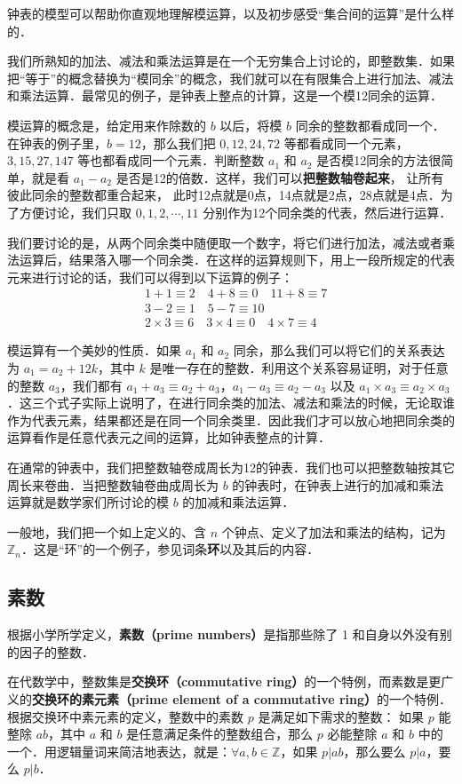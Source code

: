 钟表的模型可以帮助你直观地理解模运算，以及初步感受“集合间的运算”是什么样的．

我们所熟知的加法、减法和乘法运算是在一个无穷集合上讨论的，即整数集．如果把“等于”的概念替换为“模同余”的概念，我们就可以在有限集合上进行加法、减法和乘法运算．最常见的例子，是钟表上整点的计算，这是一个模12同余的运算．

模运算的概念是，给定用来作除数的 $b$ 以后，将模 $b$ 同余的整数都看成同一个．在钟表的例子里，$b=12$，那么我们把 $0,12,24,72$ 等都看成同一个元素，$3,15,27,147$ 等也都看成同一个元素．判断整数 $a_1$ 和 $a_2$ 是否模12同余的方法很简单，就是看 $a_1-a_2$ 是否是12的倍数．这样，我们可以\textbf{把整数轴卷起来}， 让所有彼此同余的整数都重合起来， 此时12点就是0点，14点就是2点，28点就是4点．为了方便讨论，我们只取 $0,1,2,\cdots,11$ 分别作为12个同余类的代表，然后进行运算．

我们要讨论的是，从两个同余类中随便取一个数字，将它们进行加法，减法或者乘法运算后，结果落入哪一个同余类．在这样的运算规则下，用上一段所规定的代表元来进行讨论的话，我们可以得到以下运算的例子：
\begin{equation}
\begin{aligned}
&1+1\equiv 2 \quad 4+8\equiv 0 \quad 11+8\equiv 7 \\
&3-2\equiv 1 \quad 5-7\equiv 10 \\
&2\times 3\equiv 6 \quad 3\times 4\equiv 0 \quad 4\times 7\equiv 4
\end{aligned}
\end{equation}

模运算有一个美妙的性质．如果 $a_1$ 和 $a_2$ 同余，那么我们可以将它们的关系表达为 $a_1=a_2+12k$，其中 $k$ 是唯一存在的整数．利用这个关系容易证明，对于任意的整数 $a_3$，我们都有 $a_1+a_3\equiv a_2+a_3$，$a_1-a_3\equiv a_2-a_3$ 以及 $a_1\times a_3\equiv a_2\times a_3$．这三个式子实际上说明了，在进行同余类的加法、减法和乘法的时候，无论取谁作为代表元素，结果都还是在同一个同余类里．因此我们才可以放心地把同余类的运算看作是任意代表元之间的运算，比如钟表整点的计算．

在通常的钟表中，我们把整数轴卷成周长为12的钟表．我们也可以把整数轴按其它周长来卷曲．当把整数轴卷曲成周长为 $b$ 的钟表时，在钟表上进行的加减和乘法运算就是数学家们所讨论的模 $b$ 的加减和乘法运算．

一般地，我们把一个如上定义的、含 $n$ 个钟点、定义了加法和乘法的结构，记为 $\mathbb{Z}_n$．这是“环”的一个例子，参见词条\textbf{环}以及其后的内容．

\subsection{素数}

根据小学所学定义，\textbf{素数（prime numbers）}是指那些除了 1 和自身以外没有别的因子的整数．

在代数学中，整数集是\textbf{交换环（commutative ring）}的一个特例，而素数是更广义的\textbf{交换环的素元素（prime element of a commutative ring）}的一个特例．根据交换环中素元素的定义，整数中的素数 $p$ 是满足如下需求的整数：
如果 $p$ 能整除 $ab$，其中 $a$ 和 $b$ 是任意满足条件的整数组合，那么 $p$ 必能整除 $a$ 和 $b$ 中的一个．用逻辑量词来简洁地表达，就是：$\forall a, b\in \mathbb{Z}$，如果 $p|ab$，那么要么 $p|a$，要么 $p|b$． 
